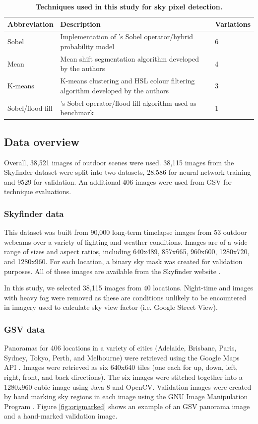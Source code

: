 \documentclass[final,3p,times,authoryear]{elsarticle}
\begin{document}
\begin{table}[!htbp]
\caption{\bf Techniques used in this study for sky pixel detection.  \label{tab:techniques}}     
\begin{tabular}{ l l l}
\textbf{Abbreviation} & \textbf{Description} & \textbf{Variations}  \\ \hline
Sobel  & Implementation of \cite{Wang2015a}'s Sobel operator/hybrid probability model & 6 \\	
Mean &  Mean shift segmentation algorithm developed by the authors &4 \\
K-means  & K-means clustering and HSL colour filtering algorithm developed by the authors &3 \\
Sobel/flood-fill  & \cite{Middel2018}'s Sobel operator/flood-fill algorithm used as benchmark &1 \\
\hline
\end{tabular}
\end{table}


\subsection{Data overview}\label{sec:data}
Overall, 38,521 images of outdoor scenes were used. 38,115 images from the Skyfinder dataset were split into two datasets, 28,586 for neural network training and 9529 for validation. An additional 406 images were used from GSV for technique evaluations.

\subsubsection{Skyfinder data}\label{sec:finderdata}
This dataset was built from 90,000 long-term timelapse images from 53 outdoor webcams over a variety of lighting and weather conditions. Images are of a wide range of sizes and aspect ratios, including 640x489, 857x665, 960x600, 1280x720, and 1280x960. For each location, a binary sky mask was created for validation purposes. All of these images are available from the Skyfinder website \citep{Mihail2015}.

In this study, we selected 38,115 images from 40 locations. Night-time and images with heavy fog were removed as these are conditions unlikely to be encountered in imagery used to calculate sky view factor (i.e. Google Street View).

\subsubsection{GSV data}\label{sec:gsvdata}
Panoramas for 406 locations in a variety of cities (Adelaide, Brisbane, Paris, Sydney, Tokyo, Perth, and Melbourne) were retrieved using the Google Maps API \citep{GoogleMaps2017b}. Images were retrieved as six 640x640 tiles (one each for up, down, left, right, front, and back directions). The six images were stitched together into a 1280x960 cubic image using Java 8 \citep{Oracle2018} and OpenCV\citep {Bradski2000}. Validation images were created by hand marking sky regions in each image using the GNU Image Manipulation Program \citep{GIMP2019}. Figure \ref{fig:origmarked} shows an example of an GSV panorama image and a hand-marked validation image.
\end{document}
